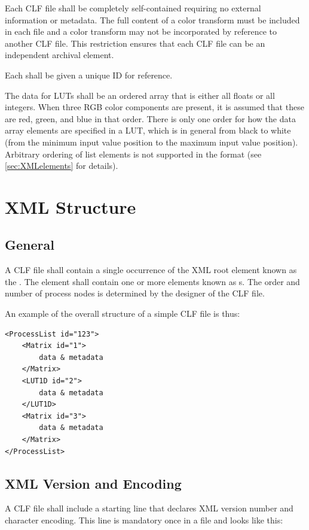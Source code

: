 Each CLF file shall be completely self-contained requiring no external information or metadata. The full content of a color transform must be included in each file and a color transform may not be incorporated by reference to another CLF file. This restriction ensures that each CLF file can be an independent archival element. 

Each  shall be given a unique ID for reference. 

The data for LUTs shall be an ordered array that is either all floats or all integers. When three RGB color components are present, it is assumed that these are red, green, and blue in that order. There is only one order for how the data array elements are specified in a LUT, which is in general from black to white (from the minimum input value position to the maximum input value position). Arbitrary ordering of list elements is not supported in the format (see \autoref{sec:XMLelements} for details).



\section{XML Structure}
\subsection{General}
A CLF file shall contain a single occurrence of the XML root element known as the . 
The  element shall contain one or more elements known as s. The order and number of process nodes is determined by the designer of the CLF file.  

An example of the overall structure of a simple CLF file is thus:

\lstset{frame=none}
\begin{lstlisting}
<ProcessList id="123">
    <Matrix id="1">
        data & metadata
    </Matrix>
    <LUT1D id="2">
        data & metadata
    </LUT1D>
    <Matrix id="3">
        data & metadata
    </Matrix>
</ProcessList>  
\end{lstlisting}


\subsection{XML Version and Encoding}
A CLF file shall include a starting line that declares XML version number and character encoding. This line is mandatory once in a file and looks like this:

